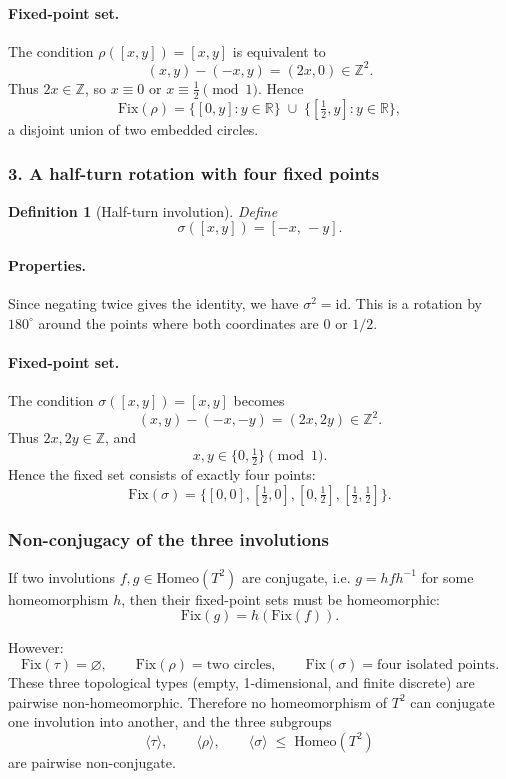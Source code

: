 \documentclass[12pt,a4paper]{article}
\theoremstyle{plain}
\newtheorem{definition}{Definition}
\theoremstyle{definition}      %
\begin{document}
\paragraph{Fixed-point set.}
The condition \(\rho([x,y])=[x,y]\) is equivalent to
\[
(x,y) - (-x,y) = (2x,0)\in\mathbb{Z}^{2}.
\]
Thus \(2x\in\mathbb{Z}\), so \(x\equiv 0\) or \(x\equiv \tfrac12 \pmod{1}\).
Hence
\[
\mathrm{Fix}(\rho)
= \{[0,y] : y\in\mathbb{R}\}
\;\cup\;
\{[\tfrac12,y] : y\in\mathbb{R}\},
\]
a disjoint union of two embedded circles.

\subsubsection*{3. A half-turn rotation with four fixed points}

\begin{definition}[Half-turn involution]
	Define
	\[
	\sigma([x,y]) = [-x,\,-y].
	\]
\end{definition}

\paragraph{Properties.}
Since negating twice gives the identity, we have \(\sigma^{2}=\mathrm{id}\).  
This is a rotation by \(180^\circ\) around the points where both 
coordinates are \(0\) or \(1/2\).

\paragraph{Fixed-point set.}
The condition \(\sigma([x,y])=[x,y]\) becomes
\[
(x,y) - (-x,-y) = (2x,2y)\in\mathbb{Z}^{2}.
\]
Thus \(2x,2y\in\mathbb{Z}\), and
\[
x,y \in \{0,\tfrac12\} \pmod{1}.
\]
Hence the fixed set consists of exactly four points:
\[
\mathrm{Fix}(\sigma)
= \{[0,0], [\tfrac12,0], [0,\tfrac12], [\tfrac12,\tfrac12]\}.
\]

\subsubsection*{Non-conjugacy of the three involutions}

If two involutions \(f,g\in\mathrm{Homeo}(T^{2})\) are conjugate, i.e.
\(
g = h f h^{-1}
\)
for some homeomorphism \(h\), then their fixed-point sets must be
homeomorphic:
\[
\mathrm{Fix}(g) = h(\mathrm{Fix}(f)).
\]

However:
\[
\mathrm{Fix}(\tau)=\varnothing,
\qquad
\mathrm{Fix}(\rho)=\text{two circles},
\qquad
\mathrm{Fix}(\sigma)=\text{four isolated points}.
\]
These three topological types (empty, 1-dimensional, and finite discrete)
are pairwise non-homeomorphic.  
Therefore no homeomorphism of \(T^{2}\) can conjugate one involution into
another, and the three subgroups
\[
\langle\tau\rangle,\qquad 
\langle\rho\rangle,\qquad 
\langle\sigma\rangle 
\;\le\; \mathrm{Homeo}(T^{2})
\]
are pairwise non-conjugate.
\end{document}
